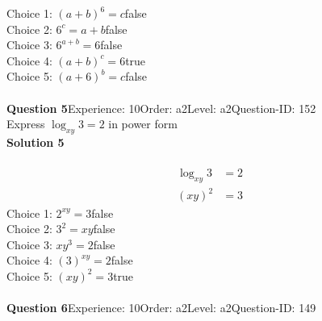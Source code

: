 \documentclass{article}
\begin{document}
Choice 1: \hspace{20pt}$(a+b)^6=c$\hspace{20pt}false\\
Choice 2: \hspace{20pt}$6^c=a+b$\hspace{20pt}false\\
Choice 3: \hspace{20pt}$6^{a+b}=6$\hspace{20pt}false\\
Choice 4: \hspace{20pt}$(a+b)^c=6$\hspace{20pt}true\\
Choice 5: \hspace{20pt}$(a+6)^b=c$\hspace{20pt}false\\
\\[4pt]
\noindent\textbf{Question 5}\hspace{20pt}Experience: 10\hspace{20pt}Order: a2\hspace{20pt}Level: a2\hspace{20pt}Question-ID: 152\\[2pt]
Express $\log_{xy}3=2$ in power form\\[4pt]
\noindent\textbf{Solution 5}\\[2pt]
\\[-35pt]\begin{align*}
\log_{xy}3&=2\\[2pt]
(xy)^2&=3
\end{align*}
Choice 1: \hspace{20pt}$2^{xy}=3$\hspace{20pt}false\\
Choice 2: \hspace{20pt}$3^2=xy$\hspace{20pt}false\\
Choice 3: \hspace{20pt}$xy^{3}=2$\hspace{20pt}false\\
Choice 4: \hspace{20pt}$(3)^{xy}=2$\hspace{20pt}false\\
Choice 5: \hspace{20pt}$(xy)^2=3$\hspace{20pt}true\\
\\[4pt]
\noindent\textbf{Question 6}\hspace{20pt}Experience: 10\hspace{20pt}Order: a2\hspace{20pt}Level: a2\hspace{20pt}Question-ID: 149\\[2pt]
\end{document}
